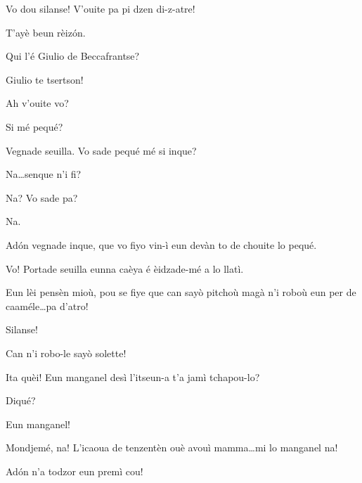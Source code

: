 \begin{drama}
\Valletspeaks Vo dou silanse! V'ouite pa pi dzen di-z-atre!

\Louisspeaks{} T'ayè beun rèiz\'on.

\Valletspeaks Qui l’é Giulio de Beccafrantse? 


\Michelspeaks Giulio te tsertson!


\Valletspeaks Ah v'ouite vo?

\Giuliospeaks{} Si mé pequé? 

\Valletspeaks Vegnade seuilla. Vo sade pequé mé si inque?

\Giuliospeaks Na\ldots senque n'i fi?

\Valletspeaks Na? Vo sade pa?

\Giuliospeaks Na.

\Valletspeaks Ad\'on vegnade inque, que vo fiyo vin-ì eun devàn to de chouite lo pequé.


\Valletspeaks{} Vo! Portade seuilla eunna caèya é èidzade-mé a lo llatì.


\Giuliospeaks{} Eun lèi pensèn mioù, pou se fiye que can sayò pitchoù magà n'i roboù eun per de caaméle\ldots pa d’atro!

\Valletspeaks Silanse! 

\Giuliospeaks Can n'i robo-le sayò solette!


\Valletspeaks{} Ita quèi! Eun manganel desì l'itseun-a t'a jamì tchapou-lo?

\Giuliospeaks Diqué?

\Valletspeaks Eun manganel!

\Giuliospeaks Mondjemé, na! L'icaoua de tenzentèn ouè avouì mamma\ldots mi lo manganel na!

\Valletspeaks Ad\'on n'a todzor eun premì cou!



\end{drama}
